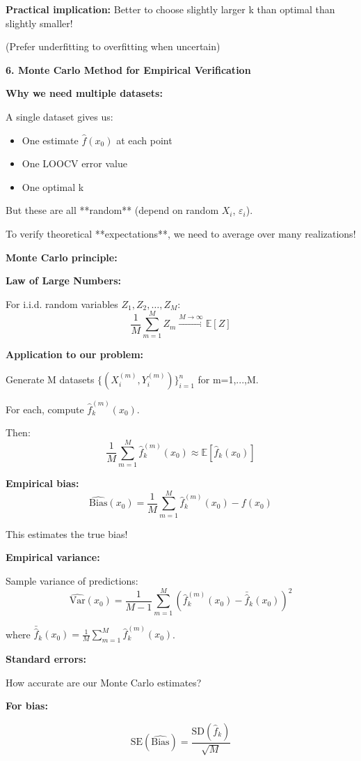 \documentclass[12pt]{article}
\begin{document}
\begin{explanation}
\textbf{Practical implication:} Better to choose slightly larger k than optimal than slightly smaller!

(Prefer underfitting to overfitting when uncertain)

\textbf{6. Monte Carlo Method for Empirical Verification}

\textbf{Why we need multiple datasets:}

A single dataset gives us:
\begin{itemize}
    \item One estimate $\hat{f}(x_0)$ at each point
    \item One LOOCV error value
    \item One optimal k
\end{itemize}

But these are all **random** (depend on random $X_i$, $\varepsilon_i$).

To verify theoretical **expectations**, we need to average over many realizations!

\textbf{Monte Carlo principle:}

\textbf{Law of Large Numbers:}

For i.i.d. random variables $Z_1, Z_2, \ldots, Z_M$:
\[
\frac{1}{M}\sum_{m=1}^M Z_m \xrightarrow{M \to \infty} \mathbb{E}[Z]
\]

\textbf{Application to our problem:}

Generate M datasets $\{(X_i^{(m)}, Y_i^{(m)})\}_{i=1}^n$ for m=1,...,M.

For each, compute $\hat{f}_k^{(m)}(x_0)$.

Then:
\[
\frac{1}{M}\sum_{m=1}^M \hat{f}_k^{(m)}(x_0) \approx \mathbb{E}[\hat{f}_k(x_0)]
\]

\textbf{Empirical bias:}
\[
\widehat{\text{Bias}}(x_0) = \frac{1}{M}\sum_{m=1}^M \hat{f}_k^{(m)}(x_0) - f(x_0)
\]

This estimates the true bias!

\textbf{Empirical variance:}

Sample variance of predictions:
\[
\widehat{\text{Var}}(x_0) = \frac{1}{M-1}\sum_{m=1}^M \left(\hat{f}_k^{(m)}(x_0) - \bar{\hat{f}}_k(x_0)\right)^2
\]

where $\bar{\hat{f}}_k(x_0) = \frac{1}{M}\sum_{m=1}^M \hat{f}_k^{(m)}(x_0)$.

\textbf{Standard errors:}

How accurate are our Monte Carlo estimates?

\textbf{For bias:}

\[
\text{SE}(\widehat{\text{Bias}}) = \frac{\text{SD}(\hat{f}_k)}{\sqrt{M}}
\]


\end{explanation}
\end{document}
